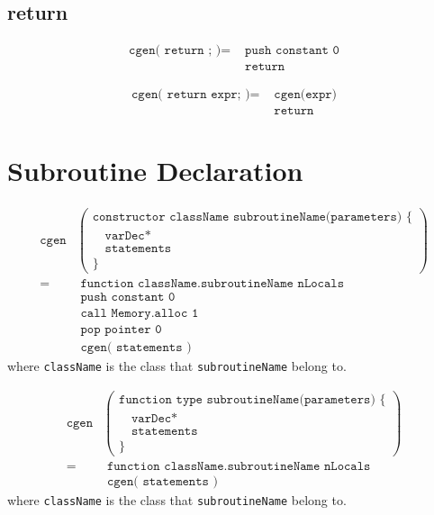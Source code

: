 \documentclass[a4paper]{book}
\begin{document}
\subsection*{return}
\begin{align*}
    \texttt{cgen( return ; )}  = & \texttt{ push constant 0} \\
                            & \texttt{ return}
\end{align*}

\begin{align*}
    \texttt{cgen( return expr; )} = & \texttt{ cgen(expr)} \\
                             & \texttt{ return}
\end{align*}

\section*{Subroutine Declaration}


\begin{align*}
    \texttt{cgen} &
    \left(
        \begin{array}{l}
            \texttt{constructor className subroutineName(parameters) \{ } \\
            \texttt{~ ~varDec*} \\
            \texttt{~ ~statements} \\
            \texttt{\} }
        \end{array}
    \right) \\
    = & \texttt{ function className.subroutineName nLocals} \\
      & \texttt{ push constant 0} \\
      & \texttt{ call Memory.alloc 1 } \\
      & \texttt{ pop pointer 0 } \\
      & \texttt{ cgen( statements )}
\end{align*}
where \texttt{className} is the class that \texttt{subroutineName} belong to.

\begin{align*}
    \texttt{cgen} &
    \left(
        \begin{array}{l}
            \texttt{function type subroutineName(parameters) \{ } \\
            \texttt{~ ~varDec*} \\
            \texttt{~ ~statements} \\
            \texttt{\} }
        \end{array}
    \right) \\
    = & \texttt{ function className.subroutineName nLocals} \\
      & \texttt{ cgen( statements )}
\end{align*}
where \texttt{className} is the class that \texttt{subroutineName} belong to.
\end{document}
